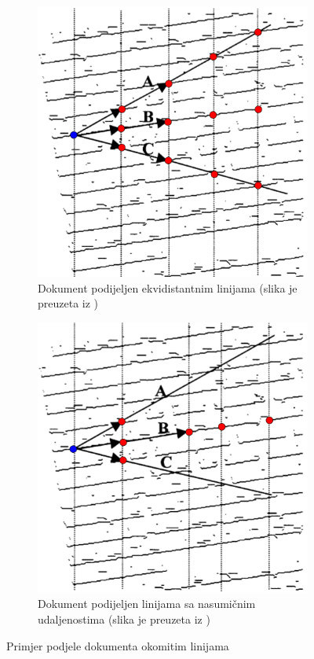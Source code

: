 \documentclass[times, utf8, zavrsni, numeric]{fer}
\begin{document}
\begin{figure}[th!]
    \centering
    \begin{subfigure}{.5\textwidth}
        \centering
        \includegraphics[width=.85\linewidth]{Images/Skew_equidistant.png}
        \captionsetup{justification=centering}
        \caption{Dokument podijeljen ekvidistantnim linijama (slika je preuzeta iz \cite{article:Skew-detection})}
        \label{fig:skew_equidistant}
    \end{subfigure}%
    \begin{subfigure}{.5\textwidth}
        \centering
        \includegraphics[width=.85\linewidth]{Images/Skew_random.png}
        \captionsetup{justification=centering}
        \caption{Dokument podijeljen linijama sa nasumičnim udaljenostima (slika je preuzeta iz \cite{article:Skew-detection})}
        \label{fig:skwe_random}
    \end{subfigure}
    \caption{Primjer podjele dokumenta okomitim linijama}
    \label{fig:skew_verticalLines}
\end{figure}
\end{document}
